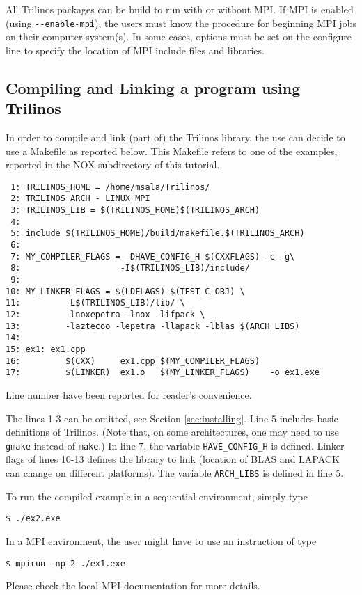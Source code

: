\begin{remark}
  All Trilinos packages can be build to run with or without MPI. If MPI
  is enabled (using \verb!--enable-mpi!), the users must know the
  procedure for beginning MPI jobs on their computer system(s). In some
  cases, options must be set on the configure line to specify the
  location of MPI include files and libraries.
\end{remark}


\subsection{Compiling and Linking a program using Trilinos}
\label{sec:intro_compiling}

In order to compile and link (part of) the Trilinos library, the use can
decide to use a Makefile as reported below. This Makefile refers to one
of the examples, reported in the NOX subdirectory of this tutorial.
\begin{verbatim}
 1: TRILINOS_HOME = /home/msala/Trilinos/
 2: TRILINOS_ARCH - LINUX_MPI
 3: TRILINOS_LIB = $(TRILINOS_HOME)$(TRILINOS_ARCH)
 4: 
 5: include $(TRILINOS_HOME)/build/makefile.$(TRILINOS_ARCH)
 6: 
 7: MY_COMPILER_FLAGS = -DHAVE_CONFIG_H $(CXXFLAGS) -c -g\
 8:                    -I$(TRILINOS_LIB)/include/
 9:
10: MY_LINKER_FLAGS = $(LDFLAGS) $(TEST_C_OBJ) \
11:         -L$(TRILINOS_LIB)/lib/ \
12:         -lnoxepetra -lnox -lifpack \
13:         -laztecoo -lepetra -llapack -lblas $(ARCH_LIBS)
14:
15: ex1: ex1.cpp
16:         $(CXX)     ex1.cpp $(MY_COMPILER_FLAGS)
17:         $(LINKER)  ex1.o   $(MY_LINKER_FLAGS)    -o ex1.exe
\end{verbatim}

Line number have been reported for  reader's convenience. 

The lines 1-3 can be omitted, see Section \ref{sec:installing}.  Line 5
includes basic definitions of Trilinos. (Note that, on some
architectures, one may need to use \verb!gmake! instead of \verb!make!.)
In line 7, the variable \verb!HAVE_CONFIG_H! is defined. Linker flags of
lines 10-13 defines the library to link (location of BLAS and LAPACK can
change on different platforms). The variable \verb!ARCH_LIBS! is defined
in line 5.

To run the compiled example in a sequential environment, simply type
\begin{verbatim}
$ ./ex2.exe
\end{verbatim}
In a MPI environment, the user might have to
use an instruction of type
\begin{verbatim}
$ mpirun -np 2 ./ex1.exe
\end{verbatim}
Please check the local MPI documentation for more details. 

